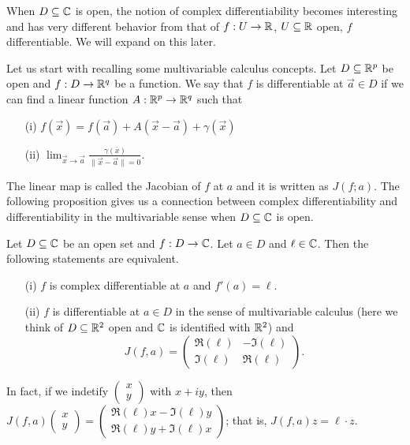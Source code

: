 \documentclass[a4paper]{article}
\begin{document}
\begin{remark} 
    When \( D \subseteq \mathbb{C}   \) is open, the notion of complex differentiability becomes interesting and has very different behavior from that of \( f: U \to \mathbb{R}  \), \( U \subseteq \mathbb{R}   \) open, \( f  \) differentiable. We will expand on this later. 
\end{remark}

Let us start with recalling some multivariable calculus concepts. Let \( D \subseteq \mathbb{R}^{p} \) be open and \( f: D \to \mathbb{R}^{q} \) be a function. We say that \( f  \) is differentiable at \( \vec{ a }  \in D  \) if we can find a linear function \( A: \mathbb{R}^{p} \to \mathbb{R}^{q} \) such that
\begin{enumerate}
    \item[(i)] \( f(\vec{ x }) = f(\vec{ a } ) + A (\vec{ x }  - \vec{ a } ) + \gamma(\vec{ x } )  \)
    \item[(ii)] \( \lim_{ \vec{ x }  \to \vec{ a }  } \frac{ \gamma(\overline{x}) }{ \|\vec{ x } - \vec{ a } \| = 0 }. \)
\end{enumerate}
The linear map is called the Jacobian of \( f  \) at \( a  \) and it is written as \( J(f;a) \). The following proposition gives us a connection between complex differentiability and differentiability in the multivariable sense when \( D \subseteq \mathbb{C}   \) is open.

\begin{prop}[ ]
   Let \( D \subseteq \mathbb{C}   \) be an open set and \( f: D \to \mathbb{C}  \). Let \( a \in D  \) and \( \ell \in \mathbb{C}  \). Then the following statements are equivalent.
   \begin{enumerate}
       \item[(i)] \( f  \) is complex differentiable at \( a  \) and \( f'(a) = \ell \).
        \item[(ii)] \( f  \) is differentiable at \( a \in D   \) in the sense of multivariable calculus (here we think of \( D \subseteq  \mathbb{R}^{2} \) open and \( \mathbb{C}  \) is identified with \( \mathbb{R}^{2} \)) and   
            \[  J(f,a) = \begin{pmatrix} \Re(\ell) & - \Im(\ell) \\ \Im(\ell) & \Re(\ell) \end{pmatrix}.  \]
   \end{enumerate} 
\end{prop}

In fact, if we indetify \( \begin{pmatrix} x \\ y \end{pmatrix}  \) with \( x + i y   \), then \( J(f,a) \begin{pmatrix} x \\ y \end{pmatrix} = \begin{pmatrix} \Re(\ell) x - \Im(\ell) y \\ \Re(\ell)y + \Im(\ell) x \end{pmatrix}  \); that is, \( J(f,a) z = \ell \cdot z \).
\end{document}
